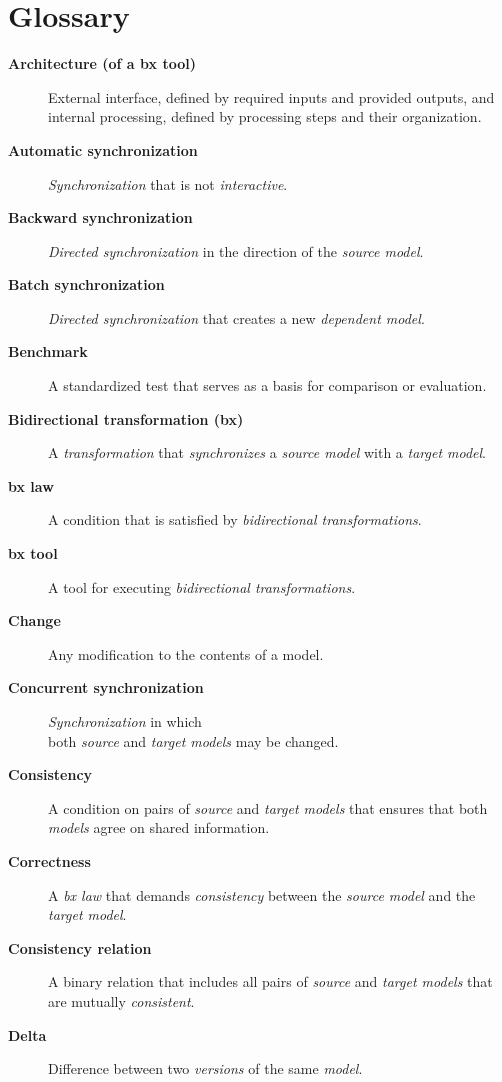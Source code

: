 
\appendix

\section{Glossary}
\label{sec:Glossary}

\begin{description}
	\item[\textbf{Architecture (of a bx tool)}] External interface, defined by required inputs and provided outputs, and internal processing, defined by processing steps and their organization.
	\item[\textbf{Automatic synchronization}] \emph{Synchronization} that is not \emph{interactive}.
	\item[\textbf{Backward synchronization}] \emph{Directed synchronization} in the direction of the \emph{source model}.
	\item[\textbf{Batch synchronization}] \emph{Directed synchronization} that creates a new \emph{dependent model}.
	\item[\textbf{Benchmark}] A standardized test that serves as a basis for comparison or evaluation.
	\item[\textbf{Bidirectional transformation (bx)}] A \emph{transformation} that \emph{synchronizes} a \emph{source model} with a \emph{target model}.
	\item[\textbf{bx law}] A condition that is satisfied by \emph{bidirectional transformations}.
	\item[\textbf{bx tool}] A tool for executing \emph{bidirectional transformations}.
	\item[\textbf{Change}] Any modification to the contents of a model.
	\item[\textbf{Concurrent synchronization}] \emph{Synchronization} in which\\ both \emph{source} and \emph{target models} may be changed.
	\item[\textbf{Consistency}] A condition on pairs of \emph{source} and \emph{target models} that ensures that both \emph{models} agree on shared information.
	\item[\textbf{Correctness}] A \emph{bx law} that demands \emph{consistency} between the \emph{source model} and the \emph{target model}. 
	\item[\textbf{Consistency relation}] A binary relation that includes all pairs of \emph{source} and \emph{target models} that are mutually \emph{consistent}.
	\item[\textbf{Delta}] Difference between two \emph{versions} of the same \emph{model}.

\end{description}
